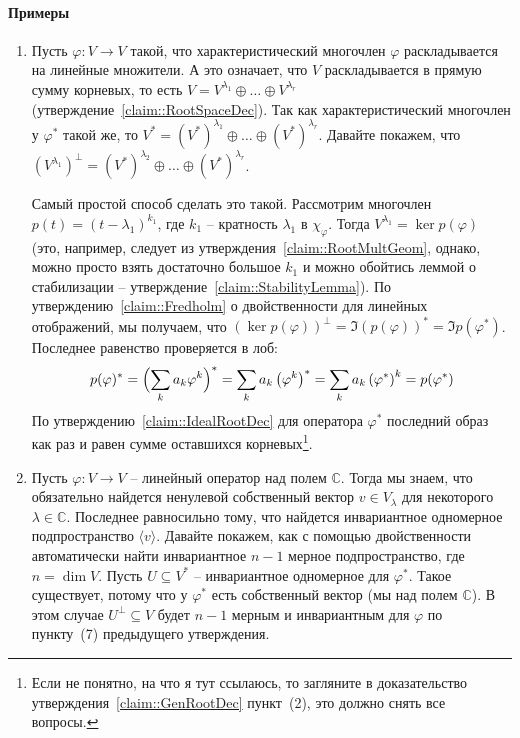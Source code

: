 \paragraph{Примеры}
\begin{enumerate}
\item Пусть $\varphi\colon V\to V$ такой, что характеристический многочлен $\varphi$ раскладывается на линейные множители. А это означает, что $V$ раскладывается в прямую сумму корневых, то есть $V = V^{\lambda_1}\oplus \ldots \oplus V^{\lambda_r}$ (утверждение~\ref{claim::RootSpaceDec}). Так как характеристический многочлен у $\varphi^*$ такой же, то $V^* = (V^*)^{\lambda_1}\oplus \ldots \oplus (V^*)^{\lambda_r}$. Давайте покажем, что $(V^{\lambda_1})^\bot = (V^*)^{\lambda_2}\oplus \ldots \oplus (V^*)^{\lambda_r}$.

Самый простой способ сделать это такой. Рассмотрим многочлен $p(t) = (t-\lambda_1)^{k_1}$, где $k_1$ -- кратность $\lambda_1$ в $\chi_\varphi$. Тогда $V^{\lambda_1} = \ker p(\varphi)$ (это, например, следует из утверждения~\ref{claim::RootMultGeom}, однако, можно просто взять достаточно большое $k_1$ и можно обойтись леммой о стабилизации -- утверждение~\ref{claim::StabilityLemma}). По утверждению~\ref{claim::Fredholm} о двойственности для линейных отображений, мы получаем, что $(\ker p(\varphi))^\bot = \Im (p(\varphi))^* = \Im p(\varphi^*)$. Последнее равенство проверяется в лоб:
\[
p(\varphi)^* =  \Bigl(\sum_ka_k\varphi^k\Bigr)^* = \sum_ka_k \left(\varphi^k\right)^* = \sum_k a_k \left(\varphi^*\right)^k = p(\varphi^*)
\]
По утверждению~\ref{claim::IdealRootDec} для оператора $\varphi^*$ последний образ как раз и равен сумме оставшихся корневых\footnote{Если не понятно, на что я тут ссылаюсь, то загляните в доказательство утверждения~\ref{claim::GenRootDec} пункт~(2), это должно снять все вопросы.}.

\item Пусть $\varphi\colon V\to V$ -- линейный оператор над полем $\mathbb C$. Тогда мы знаем, что обязательно найдется ненулевой собственный вектор $v\in V_\lambda$ для некоторого $\lambda\in \mathbb C$. Последнее равносильно тому, что найдется инвариантное одномерное подпространство $\langle v \rangle$. Давайте покажем, как с помощью двойственности автоматически найти инвариантное $n - 1$ мерное подпространство, где $n = \dim V$. Пусть $U\subseteq V^*$ -- инвариантное одномерное для $\varphi^*$. Такое существует, потому что у $\varphi^*$ есть собственный вектор (мы над полем $\mathbb C$). В этом случае $U^\bot\subseteq V$ будет $n-1$ мерным и инвариантным для $\varphi$ по пункту~(7) предыдущего утверждения.
\end{enumerate}

